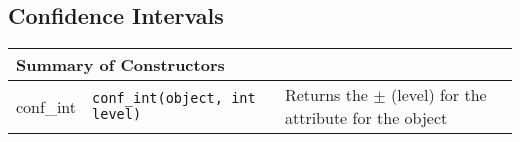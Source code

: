 \subsection{Confidence Intervals}

\begin{tabular}{|p{1.0in}|p{2.3in}||p{2.8in}|}
  \hline
  \multicolumn{3}{|l|}{\textbf{Summary of Constructors}}\\
  \hline
  conf\_int & {\tt conf\_int(object, int level)} & Returns the $\pm$ (level) for the attribute for the object\\
  \hline
\end{tabular}
